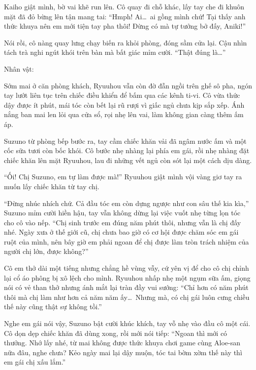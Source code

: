 \documentclass[../main.tex]{subfiles}
\begin{document}
Kaiho giật mình, bờ vai khẽ run lên. Cô quay đi chỗ khác, lấy tay che đi khuôn mặt đã đỏ bừng lên tận mang tai: ``Hmph! Ai\dots\ ai gồng mình chứ! Tại thấy anh thức khuya nên em mới tiện tay pha thôi! Đừng có mà tự tưởng bở đấy, Aniki!''

Nói rồi, cô nàng quay lưng chạy biến ra khỏi phòng, đóng sầm cửa lại. Cậu nhìn tách trà nghi ngút khói trên bàn mà bất giác mỉm cười. ``Thật đúng là\dots''

\newpage

\begin{center}
{\caviar\fontsize{12pt}{12pt}\selectfont Nhân vật:  }
\end{center}

Sớm mai ở căn phòng khách, Ryuuhou vẫn còn đờ đẫn ngồi trên ghế sô pha, ngón tay lướt liên tục trên chiếc điều khiển để bấm qua các kênh ti-vi. Cô vừa thức dậy được ít phút, mái tóc còn bết lại rũ rượi vì giấc ngủ chưa kịp sắp xếp. Ánh nắng ban mai len lỏi qua cửa sổ, rọi nhẹ lên vai, làm không gian càng thêm ấm áp.

Suzuno từ phòng bếp bước ra, tay cầm chiếc khăn vải đã ngâm nước ấm và một cốc sữa tươi còn bốc khói. Cô bước nhẹ nhàng lại phía em gái, rồi nhẹ nhàng đặt chiếc khăn lên mặt Ryuuhou, lau đi những vết ngủ còn sót lại một cách dịu dàng.

``Ối! Chị Suzuno, em tự làm được mà!'' Ryuuhou giật mình vội vàng giơ tay ra muốn lấy chiếc khăn từ tay chị.

``Đừng nhúc nhích chứ. Cả đầu tóc em còn dựng ngược như con sâu thế kia kìa,'' Suzuno mỉm cười hiền hậu, tay vẫn không dừng lại việc vuốt nhẹ từng lọn tóc cho cô vào nếp. ``Chị sinh trước em đúng năm phút thôi, nhưng vẫn là chị đấy nhé. Ngày xưa ở thế giới cũ, chị chưa bao giờ có cơ hội được chăm sóc em gái ruột của mình, nên bây giờ em phải ngoan để chị được làm tròn trách nhiệm của người chị lớn, được không?''

Cô em thở dài một tiếng nhưng chẳng hề vùng vẫy, cứ yên vị để cho cô chị chỉnh lại cổ áo phông bị xô lệch cho mình. Ryuuhou nhấp nhẹ một ngụm sữa ấm, giọng nói có vẻ than thở nhưng ánh mắt lại tràn đầy vui sướng: ``Chỉ hơn có năm phút thôi mà chị làm như hơn cả năm năm ấy\dots\ Nhưng mà, có chị gái luôn cưng chiều thế này cũng thật sự không tồi.''

Nghe em gái nói vậy, Suzuno bật cười khúc khích, tay vỗ nhẹ vào đầu cô một cái. Cô dọn dẹp chiếc khăn đã dùng xong, rồi mới nói tiếp: ``Ngoan thì mới có thưởng. Nhớ lấy nhé, từ mai không được thức khuya chơi game cùng Aloe-san nữa đâu, nghe chưa? Kẻo ngày mai lại dậy muộn, tóc tai bờm xờm thế này thì em gái chị xấu lắm.''
\end{document}
